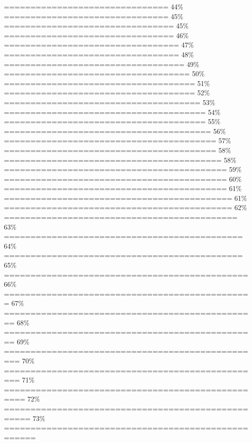 \documentclass[
]{article}
\begin{document}
\textbar=============================== \textbar{} 44\% \textbar{}
\textbar=============================== \textbar{} 45\% \textbar{}
\textbar================================ \textbar{} 45\% \textbar{}
\textbar================================ \textbar{} 46\% \textbar{}
\textbar================================= \textbar{} 47\% \textbar{}
\textbar================================= \textbar{} 48\% \textbar{}
\textbar================================== \textbar{} 49\% \textbar{}
\textbar=================================== \textbar{} 50\% \textbar{}
\textbar==================================== \textbar{} 51\% \textbar{}
\textbar==================================== \textbar{} 52\% \textbar{}
\textbar===================================== \textbar{} 53\% \textbar{}
\textbar====================================== \textbar{} 54\%
\textbar{} \textbar====================================== \textbar{}
55\% \textbar{} \textbar=======================================
\textbar{} 56\% \textbar{}
\textbar======================================== \textbar{} 57\%
\textbar{} \textbar======================================== \textbar{}
58\% \textbar{} \textbar=========================================
\textbar{} 58\% \textbar{}
\textbar========================================== \textbar{} 59\%
\textbar{} \textbar========================================== \textbar{}
60\% \textbar{} \textbar==========================================
\textbar{} 61\% \textbar{}
\textbar=========================================== \textbar{} 61\%
\textbar{} \textbar===========================================
\textbar{} 62\% \textbar{}
\textbar============================================ \textbar{} 63\%
\textbar{} \textbar=============================================
\textbar{} 64\% \textbar{}
\textbar============================================= \textbar{} 65\%
\textbar{} \textbar==============================================
\textbar{} 66\% \textbar{}
\textbar=============================================== \textbar{} 67\%
\textbar{} \textbar================================================
\textbar{} 68\% \textbar{}
\textbar================================================ \textbar{} 69\%
\textbar{} \textbar=================================================
\textbar{} 70\% \textbar{}
\textbar================================================= \textbar{}
71\% \textbar{}
\textbar================================================== \textbar{}
72\% \textbar{}
\textbar=================================================== \textbar{}
73\% \textbar{}
\textbar==================================================== \textbar{}
\end{document}
